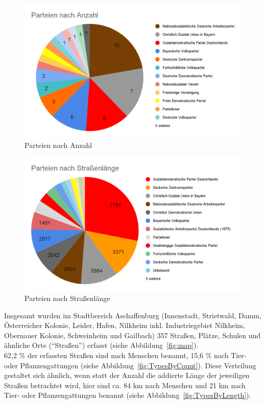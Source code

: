 \documentclass[ngerman,twocolumn,showpacs,%
  nofootinbib,aps,superscriptaddress,%
  eqsecnum,prd,notitlepage,showkeys,10pt,report]{revtex4-2}
\begin{document}
\begin{figure}
\centering
\includegraphics[width=1\linewidth,frame]{9.png}
\caption{Parteien nach Anzahl}
\label{fig:PartiesByCount}
\end{figure}
\begin{figure}
\centering
\includegraphics[width=1\linewidth,frame]{10.png}
\caption{Parteien nach Straßenlänge}
\label{fig:PartiesByLength}
\end{figure}

Insgesamt wurden im Stadtbereich Aschaffenburg (Innenstadt, Strietwald, Damm,
Österreicher Kolonie, Leider, Hafen, Nilkheim inkl. Industriegebiet Nilkheim, Obernauer
Kolonie, Schweinheim und Gailbach) 357 Straßen, Plätze, Schulen und ähnliche Orte
(“Straßen”) erfasst (siehe Abbildung~\ref{fig:map}).\\
62,2 \% der erfassten Straßen sind nach Menschen benannt, 15,6 \% nach Tier- oder
Pflanzengattungen (siehe Abbildung~\ref{fig:TypesByCount}). Diese Verteilung gestaltet sich ähnlich, wenn statt der Anzahl die
addierte Länge der jeweiligen Straßen betrachtet wird, hier sind ca. 84 km nach Menschen
und 21 km nach Tier- oder Pflanzengattungen benannt (siehe Abbildung~\ref{fig:TypesByLength}).
\end{document}
